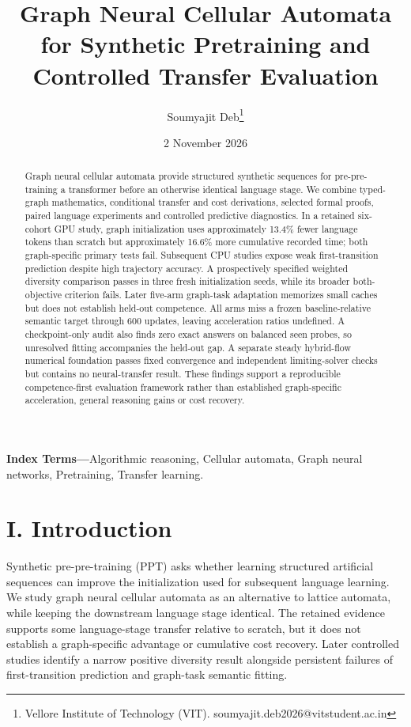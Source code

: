 \documentclass[10pt,letterpaper,twocolumn]{article}
\title{Graph Neural Cellular Automata for Synthetic Pretraining and Controlled Transfer Evaluation}
\author{Soumyajit Deb\thanks{Vellore Institute of Technology (VIT). soumyajit.deb2026@vitstudent.ac.in}}
\date{2 November 2026}
\begin{document}
\maketitle
\begin{abstract}Graph neural cellular automata provide structured synthetic sequences for pre-pre-training a transformer before an otherwise identical language stage. We combine typed-graph mathematics, conditional transfer and cost derivations, selected formal proofs, paired language experiments and controlled predictive diagnostics. In a retained six-cohort GPU study, graph initialization uses approximately 13.4\% fewer language tokens than scratch but approximately 16.6\% more cumulative recorded time; both graph-specific primary tests fail. Subsequent CPU studies expose weak first-transition prediction despite high trajectory accuracy. A prospectively specified weighted diversity comparison passes in three fresh initialization seeds, while its broader both-objective criterion fails. Later five-arm graph-task adaptation memorizes small caches but does not establish held-out competence. All arms miss a frozen baseline-relative semantic target through 600 updates, leaving acceleration ratios undefined. A checkpoint-only audit also finds zero exact answers on balanced seen probes, so unresolved fitting accompanies the held-out gap. A separate steady hybrid-flow numerical foundation passes fixed convergence and independent limiting-solver checks but contains no neural-transfer result. These findings support a reproducible competence-first evaluation framework rather than established graph-specific acceleration, general reasoning gains or cost recovery.\end{abstract}
\textbf{Index Terms---}Algorithmic reasoning, Cellular automata, Graph neural networks, Pretraining, Transfer learning.
\section*{I. Introduction}
Synthetic pre-pre-training (PPT) asks whether learning structured artificial sequences can improve the initialization used for subsequent language learning. We study graph neural cellular automata as an alternative to lattice automata, while keeping the downstream language stage identical. The retained evidence supports some language-stage transfer relative to scratch, but it does not establish a graph-specific advantage or cumulative cost recovery. Later controlled studies identify a narrow positive diversity result alongside persistent failures of first-transition prediction and graph-task semantic fitting.
\end{document}
